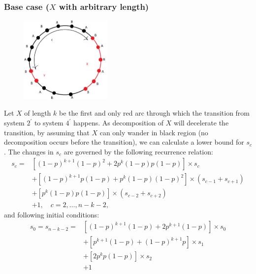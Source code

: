 \documentclass[]{book}
\theoremstyle{definition}
\begin{document}
\subsubsection{Base case ($X$ with arbitrary length)}
\begin{figure}[H]
    \centering
    \includegraphics[width=0.4\textwidth]{figures/Sync_base_general.jpg}
    \caption{}
\end{figure}
Let $X$ of length $k$ be the first and only red arc  through which the transition from system $2^\prime$ to system $4^\prime$ happens.
As decomposition of $X$ will decelerate the transition, by assuming that $X$ can only wander in black region (no decomposition occurs before the transition), we can calculate a lower bound for $s_c$. The changes in $s_c$ are governed by the following recurrence relation:
\begin{equation}
\begin{split}
    s_c 
    =& \left[ \left( 1-p \right) ^ {k+1} \left( 1-p \right) ^ 2 + 2p^k \left( 1-p \right)p \left( 1-p \right) \right]\times s_c \\
    &+\left[ \left( 1-p \right) ^ {k+1} p \left( 1-p \right) + p^k \left( 1-p \right)\left( 1-p \right) ^ 2 \right]\times \left( s_{c-1} + s_{c+1} \right) \\
    &+\left[ p^k \left( 1-p \right)p \left( 1-p \right) \right]\times \left( s_{c-2} + s_{c+2} \right) \\
    &+1, \quad c = 2,\ldots,n-k-2,
\end{split}
\end{equation}
and following initial conditions:
\begin{equation}
\begin{split}
    s_0=s_{n-k-2} 
    =&\left[ \left( 1-p \right)^{k+1}\left( 1-p \right) + 2p^{k+1}\left( 1-p \right) \right]\times s_0 \\
    &+\left[ p^{k+1}\left( 1-p \right) + \left( 1-p \right)^{k+1}p \right]\times s_1 \\
    &+\left[2p^k p\left( 1-p \right) \right]\times s_2 \\
    &+1
\end{split}
\end{equation}
\end{document}

